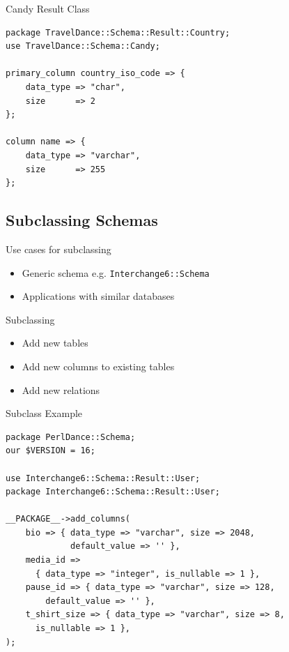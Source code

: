 \begin{frame}[fragile]{Candy Result Class}
\begin{lstlisting}
package TravelDance::Schema::Result::Country;
use TravelDance::Schema::Candy;

primary_column country_iso_code => {
    data_type => "char",
    size      => 2
};

column name => {
    data_type => "varchar",
    size      => 255
};
\end{lstlisting}
\end{frame}

\subsection{Subclassing Schemas}

\begin{frame}[fragile]{Use cases for subclassing}
\begin{itemize}
\item Generic schema e.g. \verb|Interchange6::Schema|
\item Applications with similar databases
\end{itemize}
\end{frame}

\begin{frame}{Subclassing}
\begin{itemize}
\item Add new tables
\item Add new columns to existing tables
\item Add new relations
\end{itemize}
\end{frame}

\begin{frame}[fragile]{Subclass Example}
\begin{lstlisting}
package PerlDance::Schema;
our $VERSION = 16;

use Interchange6::Schema::Result::User;
package Interchange6::Schema::Result::User;

__PACKAGE__->add_columns(
    bio => { data_type => "varchar", size => 2048, 
             default_value => '' },
    media_id =>
      { data_type => "integer", is_nullable => 1 },
    pause_id => { data_type => "varchar", size => 128, 
        default_value => '' },
    t_shirt_size => { data_type => "varchar", size => 8, 
      is_nullable => 1 },
);
\end{lstlisting}
\end{frame}

